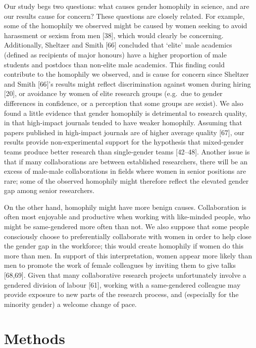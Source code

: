 \documentclass[12pt,]{article}
\begin{document}
Our study begs two questions: what causes gender homophily in science,
and are our results cause for concern? These questions are closely
related. For example, some of the homophily we observed might be caused
by women seeking to avoid harassment or sexism from men {[}38{]}, which
would clearly be concerning. Additionally, Sheltzer and Smith {[}66{]}
concluded that `elite' male academics (defined as recipients of major
honours) have a higher proportion of male students and postdocs than
non-elite male academics. This finding could contribute to the homophily
we observed, and is cause for concern since Sheltzer and Smith
{[}66{]}'s results might reflect discrimination against women during
hiring {[}20{]}, or avoidance by women of elite research groups
(e.g.~due to gender differences in confidence, or a perception that some
groups are sexist). We also found a little evidence that gender
homophily is detrimental to research quality, in that high-impact
journals tended to have weaker homophily. Assuming that papers published
in high-impact journals are of higher average quality {[}67{]}, our
results provide non-experimental support for the hypothesis that
mixed-gender teams produce better research than single-gender teams
{[}42--48{]}. Another issue is that if many collaborations are between
established researchers, there will be an excess of male-male
collaborations in fields where women in senior positions are rare; some
of the observed homophily might therefore reflect the elevated gender
gap among senior researchers.

On the other hand, homophily might have more benign causes.
Collaboration is often most enjoyable and productive when working with
like-minded people, who might be same-gendered more often than not. We
also suppose that some people consciously choose to preferentially
collaborate with women in order to help close the gender gap in the
workforce; this would create homophily if women do this more than men.
In support of this interpretation, women appear more likely than men to
promote the work of female colleagues by inviting them to give talks
{[}68,69{]}. Given that many collaborative research projects
unfortunately involve a gendered division of labour {[}61{]}, working
with a same-gendered colleague may provide exposure to new parts of the
research process, and (especially for the minority gender) a welcome
change of pace.

\section{Methods}\label{methods}
\end{document}
